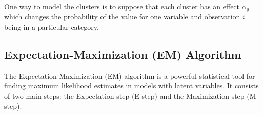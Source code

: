 \documentclass{article}
\begin{document}
One way to model the clusters is to suppose that each cluster has an 
  effect $\alpha_g$ which changes the probability of the value for one variable and  observation $i$ being in a particular category.
  


\subsection{Expectation-Maximization (EM) Algorithm}







The Expectation-Maximization (EM) algorithm is a powerful statistical tool for finding maximum likelihood estimates in models with latent variables. It consists of two main steps: the Expectation step (E-step) and the Maximization step (M-step).
\end{document}
